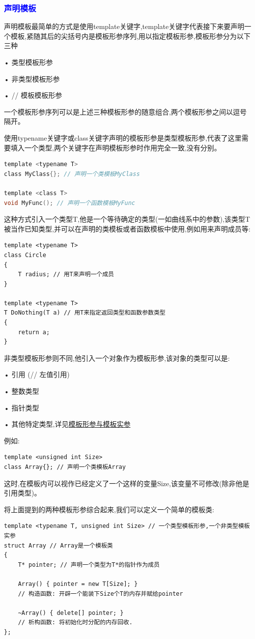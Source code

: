 \documentclass[UTF8]{ctexart}
\begin{document}
\subsubsection{\textcolor{blue}{声明模板}}
声明模板最简单的方式是使用template关键字,template关键字代表接下来要声明一个模板,紧随其后的尖括号内是模板形参序列,用以指定模板形参,模板形参分为以下三种

• 类型模板形参

• 非类型模板形参

• // 模板模板形参

一个模板形参序列可以是上述三种模板形参的随意组合,两个模板形参之间以逗号隔开。

使用typename关键字或class关键字声明的模板形参是类型模板形参,代表了这里需要填入一个类型,两个关键字在声明模板形参时作用完全一致,没有分别。
\begin{lstlisting}[language = C,basicstyle=\small\ttfamily]
template <typename T>
class MyClass{}; // 声明一个类模板MyClass

template <class T>
void MyFunc(); // 声明一个函数模板MyFunc
\end{lstlisting}

这种方式引入一个类型T,他是一个等待确定的类型(一如曲线系中的参数),该类型T被当作已知类型,并可以在声明的类模板或者函数模板中使用,例如用来声明成员等:
\begin{lstlisting}
template <typename T>
class Circle
{
    T radius; // 用T来声明一个成员
}

template <typename T>
T DoNothing(T a) // 用T来指定返回类型和函数参数类型
{
    return a; 
}
\end{lstlisting}

非类型模板形参则不同,他引入一个对象作为模板形参,该对象的类型可以是:

• 引用 (// 左值引用)

• 整数类型

• 指针类型

• 其他特定类型,详见\href{https://zh.cppreference.com/w/cpp/language/template_parameters}{模板形参与模板实参}

例如:
\begin{lstlisting}
template <unsigned int Size>
class Array{}; // 声明一个类模板Array
\end{lstlisting}

这时,在模板内可以视作已经定义了一个这样的变量Size,该变量不可修改(除非他是引用类型)。

将上面提到的两种模板形参综合起来,我们可以定义一个简单的模板类:
\begin{lstlisting}
template <typename T, unsigned int Size> // 一个类型模板形参,一个非类型模板实参
struct Array // Array是一个模板类
{
    T* pointer; // 声明一个类型为T*的指针作为成员

    Array() { pointer = new T[Size]; } 
    // 构造函数: 开辟一个能装下Size个T的内存并赋给pointer
    
    ~Array() { delete[] pointer; }
    // 析构函数: 将初始化时分配的内存回收.
};
\end{lstlisting}
\end{document}
